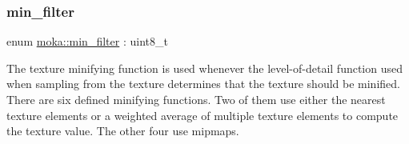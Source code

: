 \subsubsection{\texorpdfstring{min\_filter}{min\_filter}\hspace{0.1cm}{\footnotesize\ttfamily [2/2]}}
{\footnotesize\ttfamily enum \mbox{\hyperlink{namespacemoka_afeea6a53d61ee8561c91c62f5a051a77}{moka\+::min\+\_\+filter}} \+: uint8\+\_\+t\hspace{0.3cm}{\ttfamily [strong]}}



The texture minifying function is used whenever the level-\/of-\/detail function used when sampling from the texture determines that the texture should be minified. There are six defined minifying functions. Two of them use either the nearest texture elements or a weighted average of multiple texture elements to compute the texture value. The other four use mipmaps. 

